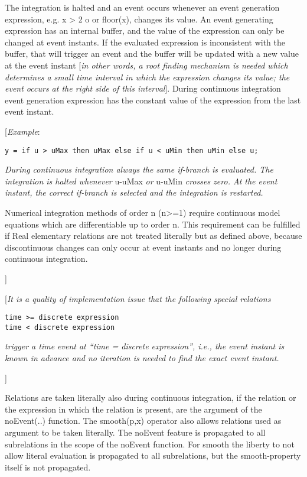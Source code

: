 The integration is halted and an event occurs whenever an event
generation expression, e.g. x \textgreater{} 2 o or floor(x), changes
its value. An event generating expression has an internal buffer, and
the value of the expression can only be changed at event instants. If
the evaluated expression is inconsistent with the buffer, that will
trigger an event and the buffer will be updated with a new value at the
event instant {[}\emph{in other words, a root finding mechanism is
needed which determines a small time interval in which the expression
changes its value; the event occurs at the right side of this
interval}{]}. During continuous integration event generation expression
has the constant value of the expression from the last event instant.

{[}\emph{Example}:
\begin{lstlisting}[language=modelica]
y = if u > uMax then uMax else if u < uMin then uMin else u;
\end{lstlisting}

\emph{During continuous integration always the same if-branch is
evaluated. The integration is halted whenever} u-uMax \emph{or} u-uMin
\emph{crosses zero. At the event instant, the correct if-branch is
selected and the integration is restarted.}

Numerical integration methods of order n (n\textgreater{}=1) require
continuous model equations which are differentiable up to order n. This
requirement can be fulfilled if Real elementary relations are not
treated literally but as defined above, because discontinuous changes
can only occur at event instants and no longer during continuous
integration.

{]}

{[}\emph{It is a quality of implementation issue that the following
special relations}
\begin{lstlisting}[language=modelica]
time >= discrete expression
time < discrete expression
\end{lstlisting}

\emph{trigger a time event at ``time = discrete expression'', i.e., the
event instant is known in advance and no iteration is needed to find the
exact event instant.}

{]}

Relations are taken literally also during continuous integration, if the
relation or the expression in which the relation is present, are the
argument of the noEvent(..) function. The smooth(p,x) operator also
allows relations used as argument to be taken literally. The noEvent
feature is propagated to all subrelations in the scope of the noEvent
function. For smooth the liberty to not allow literal evaluation is
propagated to all subrelations, but the smooth-property itself is not
propagated.

